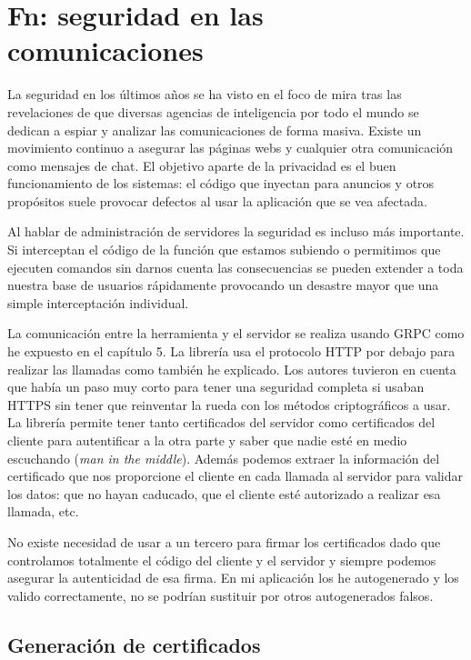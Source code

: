 \chapter{Fn: seguridad en las comunicaciones}
\label{chap:fn-seguridad}

La seguridad en los últimos años se ha visto en el foco de mira tras las revelaciones de que diversas agencias de inteligencia por todo el mundo se dedican a espiar y analizar las comunicaciones de forma masiva. Existe un movimiento continuo a asegurar las páginas webs y cualquier otra comunicación como mensajes de chat. El objetivo aparte de la privacidad es el buen funcionamiento de los sistemas: el código que inyectan para anuncios y otros propósitos suele provocar defectos al usar la aplicación que se vea afectada.

Al hablar de administración de servidores la seguridad es incluso más importante. Si interceptan el código de la función que estamos subiendo o permitimos que ejecuten comandos sin darnos cuenta las consecuencias se pueden extender a toda nuestra base de usuarios rápidamente provocando un desastre mayor que una simple interceptación individual.

La comunicación entre la herramienta y el servidor se realiza usando GRPC como he expuesto en el capítulo 5. La librería usa el protocolo HTTP por debajo para realizar las llamadas como también he explicado. Los autores tuvieron en cuenta que había un paso muy corto para tener una seguridad completa si usaban HTTPS sin tener que reinventar la rueda con los métodos criptográficos a usar. La librería permite tener tanto certificados del servidor como certificados del cliente para autentificar a la otra parte y saber que nadie esté en medio escuchando (\emph{man in the middle}). Además podemos extraer la información del certificado que nos proporcione el cliente en cada llamada al servidor para validar los datos: que no hayan caducado, que el cliente esté autorizado a realizar esa llamada, etc.

No existe necesidad de usar a un tercero para firmar los certificados dado que controlamos totalmente el código del cliente y el servidor y siempre podemos asegurar la autenticidad de esa firma. En mi aplicación los he autogenerado y los valido correctamente, no se podrían sustituir por otros autogenerados falsos.

\section{Generación de certificados}


